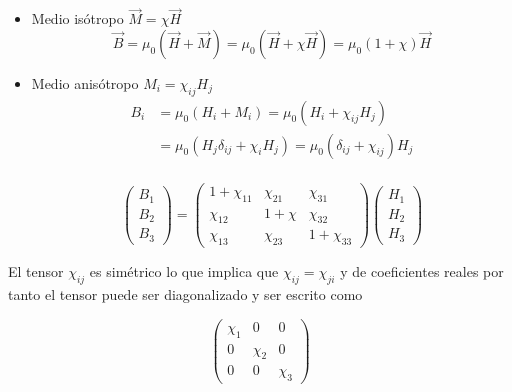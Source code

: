 \begin{itemize}
	\item Medio isótropo ${\overrightarrow{M}= \chi \overrightarrow{H}}$
	\begin{equation}
		\overrightarrow{B}=\mu_{0}(\overrightarrow{H}+\overrightarrow{M})= \mu_{0}(\overrightarrow{H}+\chi\overrightarrow{H})= \mu_{0}(1+\chi)\overrightarrow{H}
	\end{equation}
	\item Medio anisótropo ${M_{i}= \chi_{ij} H_{j}}$
	\begin{equation*}
	\begin{split}
		B_{i} & =\mu_{0}(H_{i}+M_{i})=\mu_{0}(H_{i}+\chi_{ij}H_{j})\\
		      & =\mu_{0}(H_{j}\delta_{ij}+\chi_{i}H_{j})=\mu_{0}(\delta_{ij}+\chi_{ij})H_{j} \\
	\end{split}
	\end{equation*}
	
	\begin{equation}
\begin{pmatrix}
B_{1}\\
B_{2}\\
B_{3}
\end{pmatrix}		
=
\begin{pmatrix}
1+ \chi_{11} & \chi_{21} & \chi_{31} \\
\chi_{12} & 1+\chi_{} & \chi_{32} \\
\chi_{13} & \chi_{23} & 1+\chi_{33}
\end{pmatrix}		
\begin{pmatrix}
H_{1}\\
H_{2}\\
H_{3}
\end{pmatrix}		
	\end{equation}	
	 
\end{itemize}

El tensor $\chi_{ij}$ es simétrico lo que implica que $\chi_{ij}=\chi_{ji}$ y de coeficientes reales por tanto el tensor puede ser diagonalizado y ser escrito como


\begin{equation}
\begin{pmatrix}
\chi_{1} & 0 & 0 \\
0 & \chi_{2} & 0 \\
0 & 0 & \chi_{3}
\end{pmatrix}		
\end{equation}

